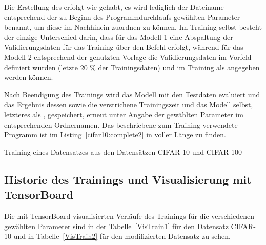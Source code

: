 Die Erstellung des  erfolgt wie gehabt, es wird lediglich der Dateiname entsprechend der zu Beginn des Programmdurchlaufs gewählten Parameter benannt, um diese im Nachhinein zuordnen zu können. Im Training selbst besteht der einzige Unterschied darin, dass für das Modell 1 eine Abspaltung der Validierungsdaten für das Training über den Befehl  erfolgt, während für das Modell 2 entsprechend der genutzten Vorlage die Validierungsdaten im Vorfeld definiert wurden (letzte 20 \% der Trainingsdaten) und im Training als  angegeben werden können.

Nach Beendigung des Trainings wird das Modell mit den Testdaten evaluiert und das Ergebnis dessen sowie die verstrichene Trainingszeit und das Modell selbst, letzteres als , gespeichert, erneut unter Angabe der gewählten Parameter im entsprechenden Ordnernamen. Das beschriebene zum Training verwendete Programm  ist im Listing~\ref{cifar10:complete2} in voller Länge zu finden.

\begin{code}
  
  \caption{Training eines Datensatzes aus den Datensätzen CIFAR-10 und CIFAR-100}
  \label{cifar10:complete2}
\end{code}


\subsection{Historie des Trainings und Visualisierung mit TensorBoard}

Die mit TensorBoard visualisierten Verläufe des Trainings für die verschiedenen gewählten Parameter sind in der Tabelle~\ref{VisTrain1} für den Datensatz CIFAR-10 und in Tabelle~\ref{VisTrain2} für den modifizierten Datensatz zu sehen.

\medskip



